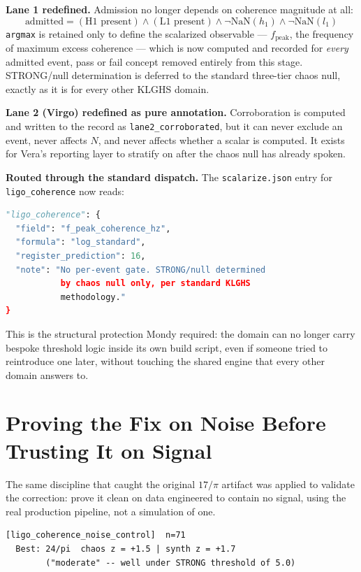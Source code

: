 \documentclass[11pt, letterpaper, openany]{book}
\begin{document}
\textbf{Lane 1 redefined.} Admission no longer depends on coherence
magnitude at all:
\[
\text{admitted} = (\text{H1 present}) \land (\text{L1 present}) \land
\lnot\text{NaN}(h_1) \land \lnot\text{NaN}(l_1)
\]
\texttt{argmax} is retained only to define the scalarized observable ---
$f_\text{peak}$, the frequency of maximum excess coherence --- which is
now computed and recorded for \emph{every} admitted event, pass or fail
concept removed entirely from this stage. STRONG/null determination is
deferred to the standard three-tier chaos null, exactly as it is for
every other KLGHS domain.

\textbf{Lane 2 (Virgo) redefined as pure annotation.} Corroboration is
computed and written to the record as \texttt{lane2\_corroborated}, but
it can never exclude an event, never affects $N$, and never affects
whether a scalar is computed. It exists for Vera's reporting layer to
stratify on after the chaos null has already spoken.

\textbf{Routed through the standard dispatch.} The \texttt{scalarize.json}
entry for \texttt{ligo\_coherence} now reads:
\begin{lstlisting}[language=Python, basicstyle=\ttfamily\small]
"ligo_coherence": {
  "field": "f_peak_coherence_hz",
  "formula": "log_standard",
  "register_prediction": 16,
  "note": "No per-event gate. STRONG/null determined
           by chaos null only, per standard KLGHS
           methodology."
}
\end{lstlisting}
This is the structural protection Mondy required: the domain can no
longer carry bespoke threshold logic inside its own build script, even
if someone tried to reintroduce one later, without touching the shared
engine that every other domain answers to.

\section{Proving the Fix on Noise Before Trusting It on Signal}

The same discipline that caught the original $17/\pi$ artifact was
applied to validate the correction: prove it clean on data engineered to
contain no signal, using the real production pipeline, not a simulation
of one.

\begin{lstlisting}[style=terminal]
[ligo_coherence_noise_control]  n=71
  Best: 24/pi  chaos z = +1.5 | synth z = +1.7
        ("moderate" -- well under STRONG threshold of 5.0)
\end{lstlisting}
\end{document}
